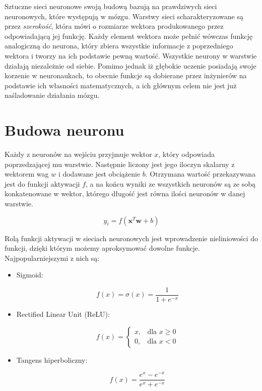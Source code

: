 \documentclass[licencjacka]{pracamgr}
\begin{document}
Sztuczne sieci neuronowe swoją budową bazują na prawdziwych sieci neuronowych, które występują w mózgu. Warstwy sieci scharakteryzowane są przez \emph{szerokość}, która mówi o rozmiarze wektora produkowanego przez odpowiadającą jej funkcję. Każdy element wektora może pełnić wówczas funkcję analogiczną do neurona, który zbiera wszystkie informacje z poprzedniego wektora i tworzy na ich podstawie pewną wartość. Wszystkie neurony w warstwie działają niezależnie od siebie. Pomimo jednak iż głębokie uczenie posiadają swoje korzenie w neuronaukach, to obecnie funkcje są dobierane przez inżynierów na podstawie ich własności matematycznych, a ich głównym celem nie jest już naśladowanie działania mózgu.

\section{Budowa neuronu}

Każdy z neuronów na wejściu przyjmuje wektor $x$, który odpowiada poprzedzającej mu warstwie. Następnie liczony jest jego iloczyn skalarny z wektorem wag $w$ i dodawane jest obciążenie $b$. Otrzymana wartość przekazywana jest do funkcji aktywacji $f$, a na końcu wyniki ze wszystkich neuronów są ze sobą konkatenowane w wektor, którego długość jest równa ilości neuronów w danej warstwie.

$$ y_i = f(\mathbf{x}^{T}\mathbf{w} + b) $$

Rolą funkcji aktywacji w sieciach neuronowych jest wprowadzenie nieliniowości do funkcji, dzięki którym możemy aproksymować dowolne funkcje. Najpopularniejszymi z nich są:

\begin{itemize}
\item Sigmoid:

$$ f(x) = \sigma(x) = \frac{1}{1 + e^{-x}}$$

\item Rectified Linear Unit (ReLU):

$$ f(x) = 
\begin{cases}
    x,              & \text{dla } x \geq 0\\
    0,              & \text{dla } x < 0
\end{cases}
$$

\item Tangens hiperboliczny:

$$ f(x) = \frac{e^x - e^{-x}}{e^x + e^{-x}} $$

\end{itemize}
\end{document}
